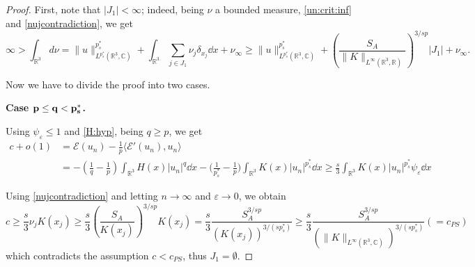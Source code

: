 \documentclass[leqno,11pt]{amsart}
\newcommand{\R}{\mathbb R}
\newcommand{\CC}{\mathbb C}
\newcommand{\C}{\mathbb C}
\newcommand{\cE}{{\mathcal E}}
\newcommand{\eps}{\varepsilon}
\numberwithin{equation}{section}
\begin{document}
\begin{proof}
First, note that $|J_1|<\infty$; indeed, being $\nu$ a bounded measure, \eqref{un:crit:inf} and \eqref{nujcontradiction},
 we get 
$$
    \infty>\int_{\R^3}d\nu=\|u\|_{L^{p^*_s}(\R^3,\C)}^{p^*_s}+\int_{\R^3}\sum_{j\in J_1}\nu_j\delta_{x_j}\dd x+\nu_\infty
    \ge \|u\|_{L^{p^*_s}(\R^3,\C)}^{p^*_s}+\left(\frac{S_A}{\|K\|_{L^\infty(\R^3,\R)}}\right)^{3/sp}|J_1|+\nu_\infty.
$$

Now we have to divide the proof into two cases.

{\bf Case ${\bf p\le q<p^*_s}$.}

Using $\psi_\eps\le 1$ and \eqref{H:hyp}, being $q\ge p$, we get
\begin{equation}\begin{aligned}
c+o(1)&= \cE(u_n)-\frac{1}{p}\langle \cE'(u_n),u_n\rangle\\
&=-\left(\frac{1}{q}-\frac{1}{p}\right)\int_{\R^3}H(x)|u_n|^{q}\dd x
-\biggl(\frac1{p^*_s}-\frac 1{p}  \biggr)\int_{\R^3}K(x)|u_n|^{p^*_s}\dd x\ge \frac{ s}{3}\int_{\R^3}K(x)|u_n|^{p^*_s}\psi_\eps\dd x
\end{aligned}\end{equation}

Using \eqref{nujcontradiction} and letting $n\to\infty$ and $\eps\to0$, we obtain
\begin{equation}\label{epn:q>p}
    c\ge \frac{ s}{3} \nu_j K(x_j)\ge \frac{ s}{3}\left( \frac{S_A}{ K(x_{j})}\right)^{3/sp} K(x_j)=\frac{s}{3}\frac{S_A^{3/sp}}{( K(x_{j}))^{3/(sp^*_s)}}\ge \frac{s}{3}\frac{S_A^{3/sp}}{( \|K\|_{L^\infty(\R^3, \CC)})^{3/(sp^*_s)}} (=c_{PS})
\end{equation}
which contradicts the assumption $c<c_{PS}$, thus $J_1 = \emptyset$. 


\end{proof}
\end{document}
